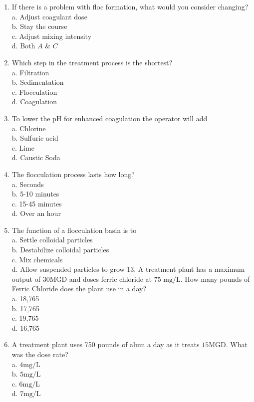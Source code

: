\documentclass[10pt]{article}
\begin{document}
\begin{enumerate}
  \item If there is a problem with floc formation, what would you consider changing?\\
a. Adjust coagulant dose\\
b. Stay the course\\
c. Adjust mixing intensity\\
d. Both $A$ \& $C$

  \item Which step in the treatment process is the shortest?\\
a. Filtration\\
b. Sedimentation\\
c. Flocculation\\
d. Coagulation

  \item To lower the $\mathrm{pH}$ for enhanced coagulation the operator will add\\
a. Chlorine\\
b. Sulfuric acid\\
c. Lime\\
d. Caustic Soda

  \item The flocculation process lasts how long?\\
a. Seconds\\
b. 5-10 minutes\\
c. 15-45 minutes\\
d. Over an hour

  \item The function of a flocculation basin is to\\
a. Settle colloidal particles\\
b. Destabilize colloidal particles\\
c. Mix chemicals\\
d. Allow suspended particles to grow 13. A treatment plant has a maximum output of $30 \mathrm{MGD}$ and doses ferric chloride at 75 $\mathrm{mg} / \mathrm{L}$. How many pounds of Ferric Chloride does the plant use in a day?\\
a. 18,765\\
b. 17,765\\
c. 19,765\\
d. 16,765

  \item A treatment plant uses 750 pounds of alum a day as it treats $15 \mathrm{MGD}$. What was the dose rate?\\
a. $4 \mathrm{mg} / \mathrm{L}$\\
b. $5 \mathrm{mg} / \mathrm{L}$\\
c. $6 \mathrm{mg} / \mathrm{L}$\\
d. $7 \mathrm{mg} / \mathrm{L}$


\end{enumerate}
\end{document}
